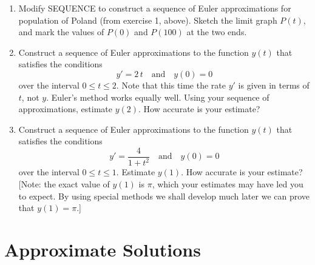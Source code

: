 \begin{enumerate}
\begin{enumerate}
  \item Change the {\bf initial
   condition} from $y(0) = 1$ to $y(0) = 9$.
 Construct the sequence of Euler approximations beginning with {\tt
   numberofsteps} being 1, and make a rough sketch of the limit
 graph. What is $y(10)$ now?  Explain why the first several
 approximations look so strange.


\end{enumerate}
\item Modify SEQUENCE to construct a sequence of Euler approximations
 for population of Poland (from exercise 1, above).  Sketch the limit
 graph $P(t)$, and mark the values of $P(0)$ and $P(100)$ at the two
 ends.


\item Construct a sequence of Euler approximations to the function
 $y(t)$ that satisfies the conditions
\[
y' = 2 \, t \quad \mbox{and} \quad y(0) = 0 
\]
over the interval $0 \leq t \leq 2$.  Note that this time the rate
 $y'$ is given in terms of $t$, not $y$.  Euler's method works equally
 well.  Using your sequence of approximations, estimate $y(2)$.  How
 accurate is your estimate?


\item Construct a sequence of Euler approximations to the function
 $y(t)$ that satisfies the conditions
\[
y' = \dfrac{4}{1+t^2} \quad \mbox{and} \quad y(0) = 0 
\]
over the interval $0 \leq t \leq 1$.  Estimate $y(1)$.  How 
accurate is your estimate?  [Note: the exact value of $y(1)$ 
is $\pi$, which your estimates may have led you to expect.  
By using special methods we shall develop much later we can 
prove that $y(1) = \pi$.]



\end{enumerate}
\section{Approximate Solutions}
\label{sec:approximate-solutions}

